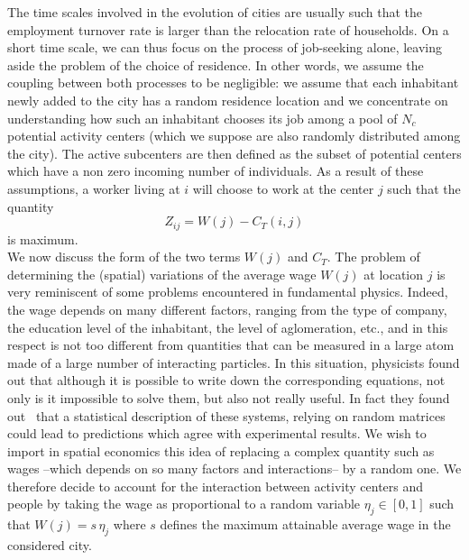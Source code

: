 The time scales involved in the evolution of cities are usually such
that the employment turnover rate is larger than the relocation
rate of households. On a short time scale, we can thus focus on the
process of job-seeking alone, leaving aside the problem of the choice of
residence. In other words, we assume the coupling between both processes to be negligible: we assume that each
inhabitant newly added to the city has a random residence location and
we concentrate on understanding how such an inhabitant chooses its job
among a pool of $N_c$ potential activity centers (which we suppose are also
randomly distributed among the city). The active subcenters are then defined as the subset of potential centers which have a non zero incoming number of
individuals. As a result of these assumptions, a worker living at $i$
will choose to work at the center $j$ such that the quantity
%
\begin{equation}
Z_{ij} = W(j) - C_T(i,j)
\end{equation}
%
is maximum. \\
We now discuss the form of the two terms $W(j)$ and
$C_T$. The problem of determining the (spatial) variations of the
average wage $W(j)$ at location $j$ is very reminiscent of some
problems encountered in fundamental physics. Indeed, the wage depends
on many different factors, ranging from the type of company, the
education level of the inhabitant, the level of aglomeration, etc.,
and in this respect is not too different from quantities that can be
measured in a large atom made of a large number of interacting
particles. In this situation, physicists found out that although it is possible
to write down the corresponding equations, not only is it
impossible to solve them, but also not really useful. In fact they
found out~\cite{Dyson:1962} that a statistical description of these
systems, relying on random matrices could lead to predictions which agree with experimental results. We wish to import in spatial economics
this idea of replacing a complex quantity such as wages --which depends on
so many factors and interactions-- by a random one. We therefore decide to
account for the interaction between activity centers and people by
taking the wage as proportional to a random variable $\eta_j \in \left[ 0,1\right]$
such that $W(j) = s\, \eta_j$ where $s$ defines the maximum attainable
average wage in the considered city.

